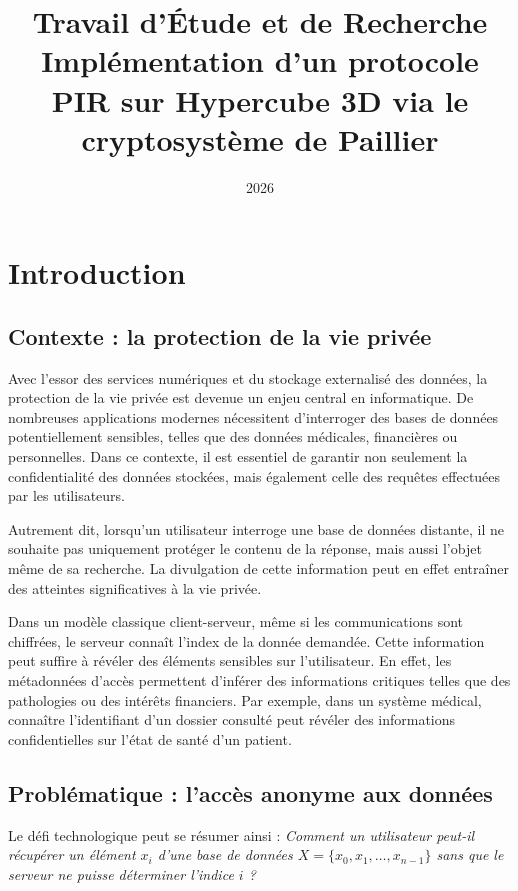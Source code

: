 \documentclass[12pt,a4paper]{report}
\title{Travail d'Étude et de Recherche \\ \textbf{Implémentation d'un protocole PIR sur Hypercube 3D via le cryptosystème de Paillier}}
\date{2026}
\begin{document}
\maketitle

\tableofcontents






\chapter{Introduction}

\section{Contexte : la protection de la vie privée}

Avec l’essor des services numériques et du stockage externalisé des données, la protection de la vie privée est devenue un enjeu central en informatique. De nombreuses applications modernes nécessitent d’interroger des bases de données potentiellement sensibles, telles que des données médicales, financières ou personnelles. Dans ce contexte, il est essentiel de garantir non seulement la confidentialité des données stockées, mais également celle des requêtes effectuées par les utilisateurs.

Autrement dit, lorsqu’un utilisateur interroge une base de données distante, il ne souhaite pas uniquement protéger le contenu de la réponse, mais aussi l’objet même de sa recherche. La divulgation de cette information peut en effet entraîner des atteintes significatives à la vie privée.

Dans un modèle classique client-serveur, même si les communications sont chiffrées, le serveur connaît l’index de la donnée demandée. Cette information peut suffire à révéler des éléments sensibles sur l’utilisateur. En effet, les métadonnées d’accès permettent d’inférer des informations critiques telles que des pathologies ou des intérêts financiers. Par exemple, dans un système médical, connaître l’identifiant d’un dossier consulté peut révéler des informations confidentielles sur l’état de santé d’un patient.


\section{Problématique : l’accès anonyme aux données}

Le défi technologique peut se résumer ainsi : \textit{Comment un utilisateur peut-il récupérer un élément $x_i$ d'une base de données $X = \{x_0, x_1, \dots, x_{n-1}\}$ sans que le serveur ne puisse déterminer l'indice $i$ ?}
\end{document}
